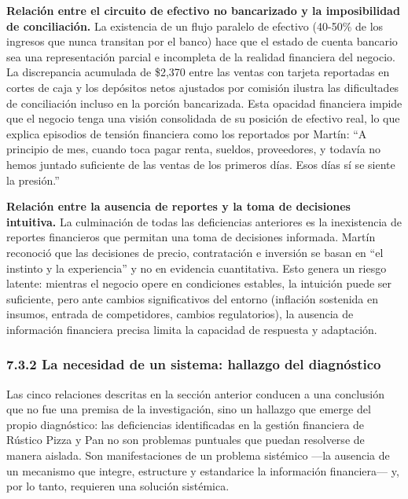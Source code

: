 \documentclass[
  12pt,
  spanish,
]{article}
\begin{document}
\textbf{Relación entre el circuito de efectivo no bancarizado y la
imposibilidad de conciliación.} La existencia de un flujo paralelo de
efectivo (40-50\% de los ingresos que nunca transitan por el banco) hace
que el estado de cuenta bancario sea una representación parcial e
incompleta de la realidad financiera del negocio. La discrepancia
acumulada de \$2,370 entre las ventas con tarjeta reportadas en cortes
de caja y los depósitos netos ajustados por comisión ilustra las
dificultades de conciliación incluso en la porción bancarizada. Esta
opacidad financiera impide que el negocio tenga una visión consolidada
de su posición de efectivo real, lo que explica episodios de tensión
financiera como los reportados por Martín: ``A principio de mes, cuando
toca pagar renta, sueldos, proveedores, y todavía no hemos juntado
suficiente de las ventas de los primeros días. Esos días sí se siente la
presión.''

\textbf{Relación entre la ausencia de reportes y la toma de decisiones
intuitiva.} La culminación de todas las deficiencias anteriores es la
inexistencia de reportes financieros que permitan una toma de decisiones
informada. Martín reconoció que las decisiones de precio, contratación e
inversión se basan en ``el instinto y la experiencia'' y no en evidencia
cuantitativa. Esto genera un riesgo latente: mientras el negocio opere
en condiciones estables, la intuición puede ser suficiente, pero ante
cambios significativos del entorno (inflación sostenida en insumos,
entrada de competidores, cambios regulatorios), la ausencia de
información financiera precisa limita la capacidad de respuesta y
adaptación.

\hypertarget{la-necesidad-de-un-sistema-hallazgo-del-diagnuxf3stico}{%
\subsubsection{7.3.2 La necesidad de un sistema: hallazgo del
diagnóstico}\label{la-necesidad-de-un-sistema-hallazgo-del-diagnuxf3stico}}

Las cinco relaciones descritas en la sección anterior conducen a una
conclusión que no fue una premisa de la investigación, sino un hallazgo
que emerge del propio diagnóstico: las deficiencias identificadas en la
gestión financiera de Rústico Pizza y Pan no son problemas puntuales que
puedan resolverse de manera aislada. Son manifestaciones de un problema
sistémico ---la ausencia de un mecanismo que integre, estructure y
estandarice la información financiera--- y, por lo tanto, requieren una
solución sistémica.
\end{document}
